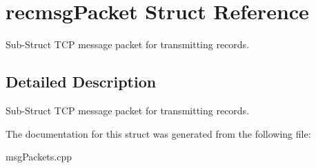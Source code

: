 \hypertarget{structrecmsgPacket}{\section{recmsg\-Packet Struct Reference}
\label{structrecmsgPacket}
}


Sub-\/\-Struct T\-C\-P message packet for transmitting records.  




\subsection{Detailed Description}
Sub-\/\-Struct T\-C\-P message packet for transmitting records. 

The documentation for this struct was generated from the following file\-:\begin{DoxyCompactItemize}
\item 
msg\-Packets.\-cpp\end{DoxyCompactItemize}
